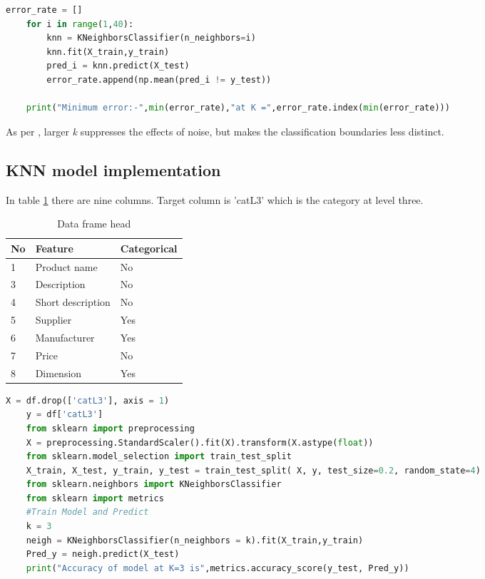 \begin{lstlisting}[language=Python]
    error_rate = []
    for i in range(1,40):
        knn = KNeighborsClassifier(n_neighbors=i)
        knn.fit(X_train,y_train)
        pred_i = knn.predict(X_test)
        error_rate.append(np.mean(pred_i != y_test))

    print("Minimum error:-",min(error_rate),"at K =",error_rate.index(min(error_rate)))
\end{lstlisting}

As per \parencite{scikit-learn}, larger \textit{k} suppresses the effects of noise, but makes the classification boundaries less distinct.

\subsection{KNN model implementation}

In table \ref{table:KNN_implementation} there are nine columns. Target column is 'catL3' which is the category at level three. 

\begin{table}[h]
    \centering
    \caption{Data frame head}
    \label{table:KNN_implementation}
    \begin{tabular}{ lll }
          \toprule
          
          \textbf{No}& \textbf{Feature} & \textbf{Categorical}\\
          \midrule
          1&Product name & No\\
          3&Description & No\\         
          4&Short description  & No\\
          5&Supplier  & Yes\\
          6&Manufacturer  &  Yes\\           
          7&Price  &  No \\
          8&Dimension  & Yes\\
          \bottomrule
          \end{tabular}
\end{table}




\begin{lstlisting}[language=Python]
    X = df.drop(['catL3'], axis = 1)
    y = df['catL3']
    from sklearn import preprocessing
    X = preprocessing.StandardScaler().fit(X).transform(X.astype(float))
    from sklearn.model_selection import train_test_split
    X_train, X_test, y_train, y_test = train_test_split( X, y, test_size=0.2, random_state=4)
    from sklearn.neighbors import KNeighborsClassifier
    from sklearn import metrics
    #Train Model and Predict
    k = 3  
    neigh = KNeighborsClassifier(n_neighbors = k).fit(X_train,y_train)
    Pred_y = neigh.predict(X_test)
    print("Accuracy of model at K=3 is",metrics.accuracy_score(y_test, Pred_y))
\end{lstlisting}

